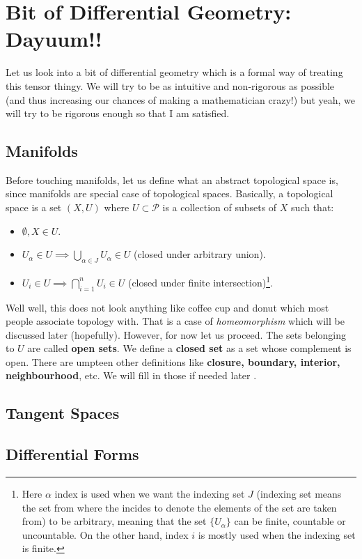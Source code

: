 \section{Bit of  Differential Geometry: Dayuum!!}
Let us look into a bit of differential geometry which is a formal way of treating this tensor thingy. We will try to be as intuitive and non-rigorous as possible (and thus increasing our chances of making a mathematician crazy!) but yeah, we will try to be rigorous enough so that I am satisfied.
\subsection{Manifolds}
Before touching manifolds, let us define what an abstract topological space is, since manifolds are special case of topological spaces. Basically, a topological space is a set $(X, U )$ where $U \subset \mathcal{P}$ is a collection of subsets of $X$ such that:
\begin{itemize}
    \item $\emptyset, X \in U$.
    \item $U_\alpha \in U \implies \bigcup \limits_{\alpha\in J} U_\alpha \in U$  (closed under arbitrary union).
    \item $U_i \in U \implies \bigcap \limits_{i=1}^n U_i \in U$  (closed under finite intersection)\footnote{Here $\alpha$ index is used when we want the indexing set $J$ (indexing set means the set from where the incides to denote the elements of the set are taken from) to be arbitrary, meaning that the set $\{U_\alpha\}$ can be finite, countable or uncountable. On the other hand, index $i$ is mostly used when the indexing set is finite.}.
\end{itemize}
Well well, this does not look anything like coffee cup and donut which most people associate topology with. That is a case of \textit{homeomorphism} which will be discussed later (hopefully). However, for now let us proceed. The sets belonging to $U$ are called \textbf{open sets}. We define a \textbf{closed set} as a set whose complement is open. There are umpteen other definitions like \textbf{closure, boundary, interior, neighbourhood}, etc. We will fill in those if needed later . 
\subsection{Tangent Spaces}
\subsection{Differential Forms}
